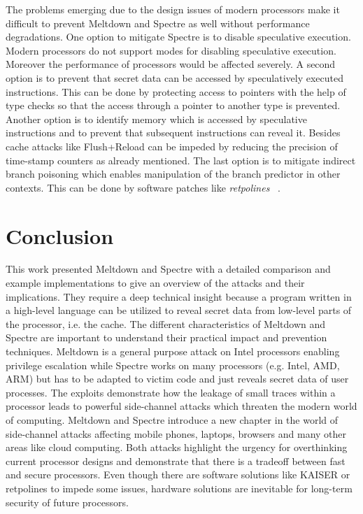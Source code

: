 \documentclass[a4paper,oneside,openright] {scrreprt}
\begin{document}
The problems emerging due to the design issues of modern processors make it difficult to prevent Meltdown and Spectre 
as well without performance degradations.
One option to mitigate Spectre is to disable speculative execution. 
Modern processors do not support modes for disabling speculative execution. 
Moreover the performance of processors would be affected severely.
A second option is to prevent that secret data can be accessed by speculatively executed instructions. 
This can be done by protecting access to pointers with the help of type checks 
so that the access through a pointer to another type is prevented.
Another option is to identify memory which is accessed by speculative instructions and to prevent that subsequent
instructions can reveal it.
Besides cache attacks like Flush+Reload can be impeded by reducing the precision of time-stamp counters as already mentioned.
The last option is to mitigate indirect branch poisoning which enables manipulation of the branch predictor in other contexts.
This can be done by software patches like \textit{retpolines} ~\cite{retpoline}.
\chapter{Conclusion}
\label{ch:conclusion}

This work presented Meltdown and Spectre with a detailed comparison and example implementations to give 
an overview of the attacks and their implications.
They require a deep technical insight because a program written in a high-level language can be utilized 
to reveal secret data from low-level parts of the processor, i.e. the cache.
The different characteristics of Meltdown and Spectre are important to understand their practical impact
and prevention techniques.
Meltdown is a general purpose attack on Intel processors enabling privilege escalation while Spectre 
works on many processors (e.g. Intel, AMD, ARM) but has to be adapted to victim code and just reveals secret data of user processes.
The exploits demonstrate how the leakage of small traces within a processor leads to powerful side-channel attacks
which threaten the modern world of computing. 
Meltdown and Spectre introduce a new chapter in the world of side-channel attacks affecting mobile phones, laptops, browsers and 
many other areas like cloud computing.
Both attacks highlight the urgency for overthinking current processor designs and demonstrate that there is a tradeoff between
fast and secure processors.
Even though there are software solutions like KAISER or retpolines to impede some issues, 
hardware solutions are inevitable for long-term security of future processors.

\lstlistoflistings



\end{document}
